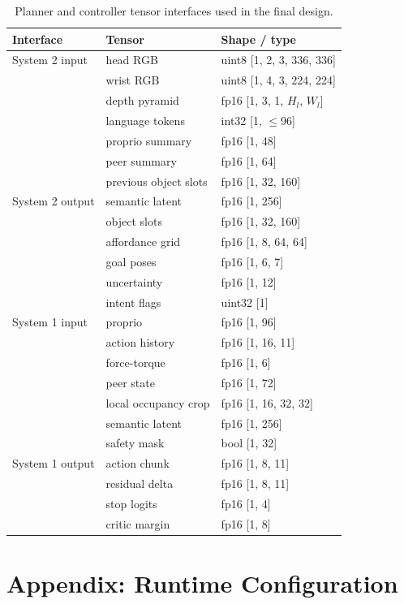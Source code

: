 \documentclass[10pt,twocolumn]{article}
\begin{document}
\begin{table}[h]
\centering
\caption{Planner and controller tensor interfaces used in the final design.}
\begin{tabular}{lll}
\toprule
Interface & Tensor & Shape / type \\
\midrule
System 2 input & head RGB & uint8 [1, 2, 3, 336, 336] \\
 & wrist RGB & uint8 [1, 4, 3, 224, 224] \\
 & depth pyramid & fp16 [1, 3, 1, $H_l$, $W_l$] \\
 & language tokens & int32 [1, $\leq$96] \\
 & proprio summary & fp16 [1, 48] \\
 & peer summary & fp16 [1, 64] \\
 & previous object slots & fp16 [1, 32, 160] \\
\midrule
System 2 output & semantic latent & fp16 [1, 256] \\
 & object slots & fp16 [1, 32, 160] \\
 & affordance grid & fp16 [1, 8, 64, 64] \\
 & goal poses & fp16 [1, 6, 7] \\
 & uncertainty & fp16 [1, 12] \\
 & intent flags & uint32 [1] \\
\midrule
System 1 input & proprio & fp16 [1, 96] \\
 & action history & fp16 [1, 16, 11] \\
 & force-torque & fp16 [1, 6] \\
 & peer state & fp16 [1, 72] \\
 & local occupancy crop & fp16 [1, 16, 32, 32] \\
 & semantic latent & fp16 [1, 256] \\
 & safety mask & bool [1, 32] \\
\midrule
System 1 output & action chunk & fp16 [1, 8, 11] \\
 & residual delta & fp16 [1, 8, 11] \\
 & stop logits & fp16 [1, 4] \\
 & critic margin & fp16 [1, 8] \\
\bottomrule
\end{tabular}
\end{table}

\section{Appendix: Runtime Configuration}
\end{document}
